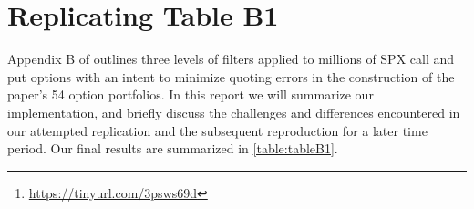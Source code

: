 \begin{titlepage}

% 
\maketitle


\doublespacing
\begin{abstract}
In this report we summarize our efforts to replicate the data filtration process described in Appendix B of \textit{The Puzzle of Index Option Returns} by \citet{constantinides2013}. These filters shape the underlying distribution of implied volatility (``IV'') and moneyness for a large cross-section of SPX index options (1 million+), and were used to build and price 54 option portfolios in the original paper. Due to the unavailability of SPX option data from 1985 to 1995, we focus our analysis on replicating the filtration results OptionMetrics data from \STARTONE\  to \ENDONE. We then apply these filters to more recent data from \STARTTWO\  to \ENDTWO. Through a sequence of data visualizations, we show that while the paper's intricately constructed data filters may yield elegant results when applied to one time period, these results do not necessarily port over to other time periods. The implications for option pricing models based on such time-fragile data filters would be an interesting follow-up study. Our detailed analysis and code can be readily found on \href{https://tinyurl.com/3psws69d}{Github}\footnote{ \url{https://tinyurl.com/3psws69d}}.  


\end{abstract}


\end{titlepage}

\doublespacing


\section{Replicating Table B1}

Appendix B of \citet{constantinides2013} outlines three levels of filters applied to millions of SPX call and put options with an intent to minimize quoting errors in the construction of the paper's 54 option portfolios. In this report we will summarize our implementation, and briefly discuss the challenges and differences encountered in our attempted replication and the subsequent reproduction for a later time period. Our final results are summarized in \autoref{table:tableB1}. 
\newpage

